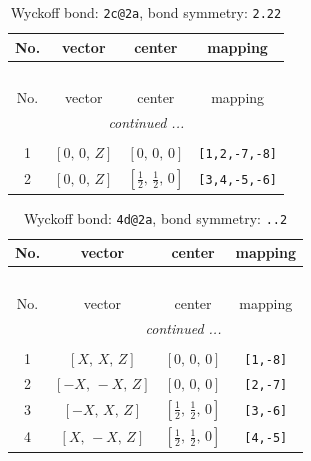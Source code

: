 \documentclass[fleqn,8pt]{jsarticle}
\begin{document}
\renewcommand{\arraystretch}{1.2}
\begin{longtable}{cccc}
\caption{Wyckoff bond: {\tt 2c@2a}, bond symmetry: {\tt 2.22}}
 \\
 \hline \hline
No. & vector & center & mapping \\ \hline \endfirsthead

\multicolumn{3}{l}{\tablename\ \thetable{}} \\
 \hline \hline
No. & vector & center & mapping \\ \hline \endhead

 \hline \hline
\multicolumn{3}{r}{\footnotesize\it continued ...} \\ \endfoot

 \hline \hline
\multicolumn{3}{r}{} \\ \endlastfoot

1 & $\left[ 0,\, 0,\, Z \right]$ & $\left[ 0,\, 0,\, 0 \right]$ & {\tt [1,2,-7,-8]} \\ \hline
2 & $\left[ 0,\, 0,\, Z \right]$ & $\left[ \frac{1}{2},\, \frac{1}{2},\, 0 \right]$ & {\tt [3,4,-5,-6]} \\
\end{longtable}
\renewcommand{\arraystretch}{1.2}
\begin{longtable}{cccc}
\caption{Wyckoff bond: {\tt 4d@2a}, bond symmetry: {\tt ..2}}
 \\
 \hline \hline
No. & vector & center & mapping \\ \hline \endfirsthead

\multicolumn{3}{l}{\tablename\ \thetable{}} \\
 \hline \hline
No. & vector & center & mapping \\ \hline \endhead

 \hline \hline
\multicolumn{3}{r}{\footnotesize\it continued ...} \\ \endfoot

 \hline \hline
\multicolumn{3}{r}{} \\ \endlastfoot

1 & $\left[ X,\, X,\, Z \right]$ & $\left[ 0,\, 0,\, 0 \right]$ & {\tt [1,-8]} \\ \hline
2 & $\left[ - X,\, - X,\, Z \right]$ & $\left[ 0,\, 0,\, 0 \right]$ & {\tt [2,-7]} \\ \hline
3 & $\left[ - X,\, X,\, Z \right]$ & $\left[ \frac{1}{2},\, \frac{1}{2},\, 0 \right]$ & {\tt [3,-6]} \\ \hline
4 & $\left[ X,\, - X,\, Z \right]$ & $\left[ \frac{1}{2},\, \frac{1}{2},\, 0 \right]$ & {\tt [4,-5]} \\
\end{longtable}
\end{document}
